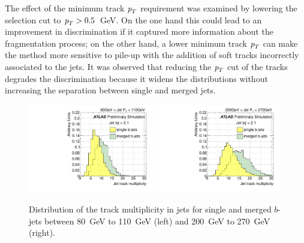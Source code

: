 The effect of the minimum track ${\emph{p}_{T}}$ requirement was examined by lowering the selection cut to ${\emph{p}_{T}} > 0.5$~GeV. On the one hand this could lead to an improvement in discrimination if it captured more information about the fragmentation process; on the other hand, a lower minimum track ${\emph{p}_{T}}$ can make the method more sensitive to pile-up with the addition of soft tracks incorrectly associated to the jets.
It was observed that reducing the ${\emph{p}_{T}}$ cut of the tracks degrades the discrimination because it widens the distributions without increasing the separation between single and merged jets. 

\begin{figure}[tp]
\centering
\includegraphics[width=0.49\textwidth]{FIGS/VarsSingleMerged/Ntrk080.pdf}
\includegraphics[width=0.49\textwidth]{FIGS/VarsSingleMerged/Ntrk200.pdf}
\caption{Distribution of the track multiplicity in jets for single and merged $b$-jets between 80~GeV to 110~GeV (left) and 200~GeV to 270~GeV (right).}
\label{fig:ntrksinglemerged}
\end{figure}


